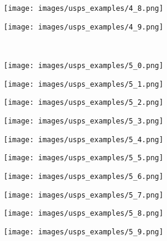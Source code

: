 \begin{figure}[t]
\begin{subfigure}[c]{0.07\textwidth}
 \end{subfigure}
 \begin{subfigure}[c]{0.07\textwidth}
  \centering
  \texttt{[image: images/usps\_examples/4\_8.png]}
 \end{subfigure}
 \begin{subfigure}[c]{0.07\textwidth}
  \centering
  \texttt{[image: images/usps\_examples/4\_9.png]}
 \end{subfigure}
 \\
 \begin{subfigure}[c]{0.07\textwidth}
  \centering
  \texttt{[image: images/usps\_examples/5\_0.png]}
 \end{subfigure}
 \begin{subfigure}[c]{0.07\textwidth}
  \centering
  \texttt{[image: images/usps\_examples/5\_1.png]}
 \end{subfigure}
 \begin{subfigure}[c]{0.07\textwidth}
  \centering
  \texttt{[image: images/usps\_examples/5\_2.png]}
 \end{subfigure}
 \begin{subfigure}[c]{0.07\textwidth}
  \centering
  \texttt{[image: images/usps\_examples/5\_3.png]}
 \end{subfigure}
 \begin{subfigure}[c]{0.07\textwidth}
  \centering
  \texttt{[image: images/usps\_examples/5\_4.png]}
 \end{subfigure}
 \begin{subfigure}[c]{0.07\textwidth}
  \centering
  \texttt{[image: images/usps\_examples/5\_5.png]}
 \end{subfigure}
 \begin{subfigure}[c]{0.07\textwidth}
  \centering
  \texttt{[image: images/usps\_examples/5\_6.png]}
 \end{subfigure}
 \begin{subfigure}[c]{0.07\textwidth}
  \centering
  \texttt{[image: images/usps\_examples/5\_7.png]}
 \end{subfigure}
 \begin{subfigure}[c]{0.07\textwidth}
  \centering
  \texttt{[image: images/usps\_examples/5\_8.png]}
 \end{subfigure}
 \begin{subfigure}[c]{0.07\textwidth}
  \centering
  \texttt{[image: images/usps\_examples/5\_9.png]}

\end{subfigure}
\end{figure}
